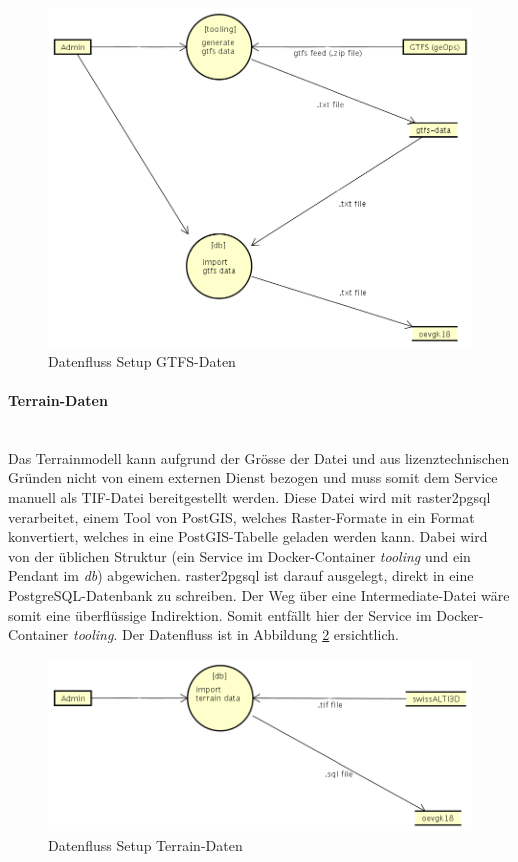 \begin{figure}[ht]
    \centering
    \includegraphics[width=0.8\linewidth]{projectdoc/img/dataflow-docker-setup-gtfs-data.png}
    \caption[Datenfluss Setup GTFS-Daten]{Datenfluss Setup GTFS-Daten}
    \label{fig:dataflow-docker-setup-gtfs-data}
\end{figure}

\paragraph{Terrain-Daten}~\\
Das Terrainmodell kann aufgrund der Grösse der Datei und aus lizenztechnischen Gründen nicht von einem externen Dienst bezogen und muss somit dem Service manuell als TIF-Datei bereitgestellt werden.
Diese Datei wird mit raster2pgsql~\cite{raster2pgsql} verarbeitet, einem Tool von PostGIS, welches Raster-Formate in ein Format konvertiert, welches in eine PostGIS-Tabelle geladen werden kann.
Dabei wird von der üblichen Struktur (ein Service im Docker-Container \emph{tooling} und ein Pendant im \emph{db}) abgewichen.
raster2pgsql ist darauf ausgelegt, direkt in eine PostgreSQL-Datenbank zu schreiben.
Der Weg über eine Intermediate-Datei wäre somit eine überflüssige Indirektion.
Somit entfällt hier der Service im Docker-Container \emph{tooling}.
Der Datenfluss ist in Abbildung \ref{fig:dataflow-docker-setup-terrain-data} ersichtlich.

\begin{figure}[ht]
    \centering
    \includegraphics[width=0.8\linewidth]{projectdoc/img/dataflow-docker-setup-terrain-data.png}
    \caption[Datenfluss Setup Terrain-Daten]{Datenfluss Setup Terrain-Daten}
    \label{fig:dataflow-docker-setup-terrain-data}
\end{figure}

